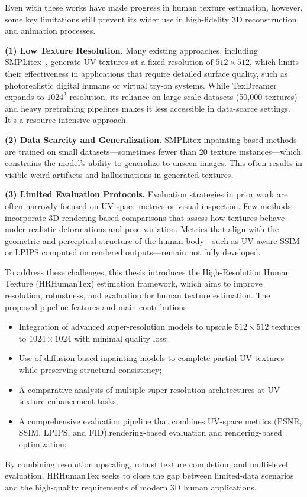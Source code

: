 Even with these works have made progress in human texture estimation, however, some key limitations still prevent its wider use in high-fidelity 3D reconstruction and animation processes.

\textbf{(1) Low Texture Resolution.}  
Many existing approaches, including SMPLitex~\cite{casas2023smplitex}, generate UV textures at a fixed resolution of $512{\times}512$, which limits their effectiveness in applications that require detailed surface quality, such as photorealistic digital humans or virtual try-on systems. While TexDreamer~\cite{liu2024texdreamer} expands to $1024^2$ resolution, its reliance on large-scale datasets (50,000 textures) and heavy pretraining pipelines makes it less accessible in data-scarce settings. It's a resource-intensive approach.

\textbf{(2) Data Scarcity and Generalization.}  
SMPLitex inpainting-based methods are trained on small datasets—sometimes fewer than 20 texture instances—which constrains the model's ability to generalize to unseen images. This often results in visible weird artifacts and hallucinations in generated textures.

\textbf{(3) Limited Evaluation Protocols.}  
Evaluation strategies in prior work are often narrowly focused on UV-space metrics or visual inspection. Few methods incorporate 3D rendering-based comparisons that assess how textures behave under realistic deformations and pose variation. Metrics that align with the geometric and perceptual structure of the human body—such as UV-aware SSIM or LPIPS computed on rendered outputs—remain not fully developed.

\medskip

\noindent
To address these challenges, this thesis introduces the High-Resolution Human Texture (HRHumanTex) estimation framework, which aims to improve resolution, robustness, and evaluation for human texture estimation. The proposed pipeline features and main contributions:

\begin{itemize}
    \item Integration of advanced super-resolution models to upscale $512{\times}512$ textures to $1024{\times}1024$ with minimal quality loss;
    \item Use of diffusion-based inpainting models to complete partial UV textures while preserving structural consistency;
    \item A comparative analysis of multiple super-resolution architectures at UV texture enhancement tasks;
    \item A comprehensive evaluation pipeline that combines UV-space metrics (PSNR, SSIM, LPIPS, and FID),rendering-based evaluation and rendering-based optimization.
\end{itemize}

By combining resolution upscaling, robust texture completion, and multi-level evaluation, HRHumanTex seeks to close the gap between limited-data scenarios and the high-quality requirements of modern 3D human applications.
